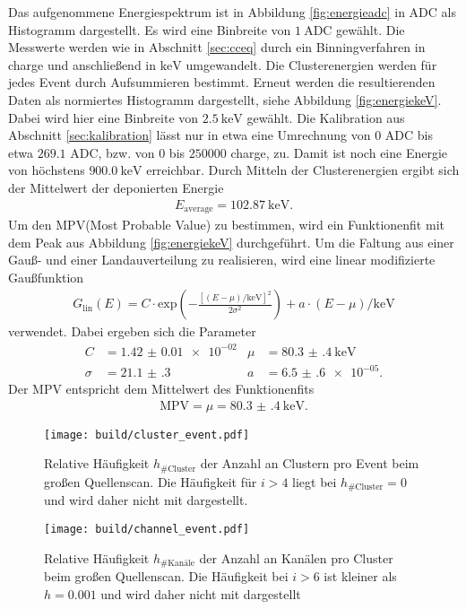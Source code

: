 Das aufgenommene Energiespektrum ist in Abbildung \ref{fig:energieadc} in ADC als
Histogramm dargestellt. Es wird eine Binbreite von $\SI{1}{\text{ADC}}$ gewählt.
Die Messwerte werden wie in Abschnitt \ref{sec:cceq} durch ein Binningverfahren in charge und anschließend
in $\si{\kilo\electronvolt}$ umgewandelt. Die Clusterenergien werden für jedes Event durch Aufsummieren
bestimmt. Erneut werden die resultierenden Daten als normiertes Histogramm dargestellt, siehe Abbildung \ref{fig:energiekeV}. Dabei wird hier eine Binbreite
von $\SI{2.5}{\kilo\electronvolt}$ gewählt. Die Kalibration aus Abschnitt \ref{sec:kalibration} lässt nur in etwa
eine Umrechnung von $0$ ADC bis etwa $269.1$ ADC, bzw. von $0$ bis $250000$ charge, zu. Damit ist noch eine Energie von höchstens
$\SI{900.0}{\kilo\electronvolt}$ erreichbar. Durch Mitteln der Clusterenergien ergibt sich der Mittelwert der deponierten Energie
\begin{align}
  E_\text{average} = \SI{102.87}{\kilo\electronvolt}.
\end{align}
Um den MPV(Most Probable Value) zu bestimmen, wird ein Funktionenfit mit dem Peak aus Abbildung \ref{fig:energiekeV} durchgeführt.
Um die Faltung aus einer Gauß- und einer Landauverteilung zu realisieren, wird eine linear modifizierte Gaußfunktion
\begin{align}
  G_\text{lin}(E) = C \cdot \text{exp}\left(-\frac{\left[(E-\mu)/\si{\kilo\electronvolt}\right]^2}{2\sigma^2} \right) + a \cdot (E-\mu)/\si{\kilo\electronvolt}
\end{align}
verwendet. Dabei ergeben sich die Parameter
\begin{align}
  C &= \num{1.42(1)e-02} & \mu &= \SI{80.3(4)}{\kilo\electronvolt} \\
  \sigma &= \num{21.1(3)} & a &= \num{6.5(6)e-05}.
\end{align}
Der MPV entspricht dem Mittelwert des Funktionenfits
\begin{align}
  \text{MPV} = \mu = \SI{80.3(4)}{\kilo\electronvolt}.
\end{align}

\begin{figure}
  \centering
  \texttt{[image: build/cluster\_event.pdf]}
  \caption{Relative Häufigkeit $h_{\#\text{Cluster}}$ der Anzahl an Clustern pro Event beim großen Quellenscan. Die Häufigkeit für $i>4$ liegt bei $h_{\#\text{Cluster}}=0$ und wird daher nicht mit dargestellt.}
  \label{fig:clusterevent}
\end{figure}

\begin{figure}
  \centering
  \texttt{[image: build/channel\_event.pdf]}
  \caption{Relative Häufigkeit $h_{\#\text{Kanäle}}$ der Anzahl an Kanälen pro Cluster beim großen Quellenscan. Die Häufigkeit bei $i > 6$ ist kleiner als $h = 0.001$ und wird daher nicht mit dargestellt}
  \label{fig:channelevent}
\end{figure}

